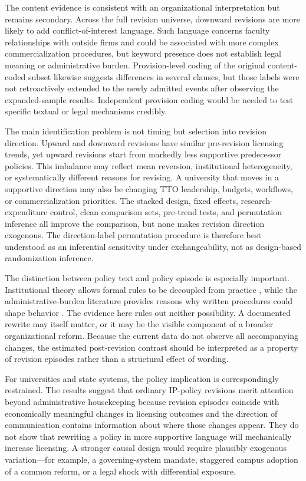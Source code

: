 The content evidence is consistent with an organizational interpretation but remains secondary. Across the full revision universe, downward revisions are more likely to add conflict-of-interest language. Such language concerns faculty relationships with outside firms and could be associated with more complex commercialization procedures, but keyword presence does not establish legal meaning or administrative burden. Provision-level coding of the original content-coded subset likewise suggests differences in several clauses, but those labels were not retroactively extended to the newly admitted events after observing the expanded-sample results. Independent provision coding would be needed to test specific textual or legal mechanisms credibly.

The main identification problem is not timing but selection into revision direction. Upward and downward revisions have similar pre-revision licensing trends, yet upward revisions start from markedly less supportive predecessor policies. This imbalance may reflect mean reversion, institutional heterogeneity, or systematically different reasons for revising. A university that moves in a supportive direction may also be changing TTO leadership, budgets, workflows, or commercialization priorities. The stacked design, fixed effects, research-expenditure control, clean comparison sets, pre-trend tests, and permutation inference all improve the comparison, but none makes revision direction exogenous. The direction-label permutation procedure is therefore best understood as an inferential sensitivity under exchangeability, not as design-based randomization inference.

The distinction between policy text and policy episode is especially important. Institutional theory allows formal rules to be decoupled from practice \citep{MeyerRowan1977}, while the administrative-burden literature provides reasons why written procedures could shape behavior \citep{MoynihanHerdHarvey2015,HerdMoynihan2018}. The evidence here rules out neither possibility. A documented rewrite may itself matter, or it may be the visible component of a broader organizational reform. Because the current data do not observe all accompanying changes, the estimated post-revision contrast should be interpreted as a property of revision episodes rather than a structural effect of wording.

For universities and state systems, the policy implication is correspondingly restrained. The results suggest that ordinary IP-policy revisions merit attention beyond administrative housekeeping because revision episodes coincide with economically meaningful changes in licensing outcomes and the direction of communication contains information about where those changes appear. They do not show that rewriting a policy in more supportive language will mechanically increase licensing. A stronger causal design would require plausibly exogenous variation---for example, a governing-system mandate, staggered campus adoption of a common reform, or a legal shock with differential exposure.

